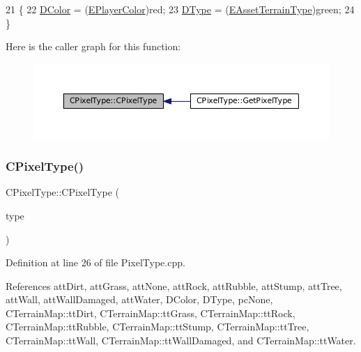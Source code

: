 \begin{DoxyCode}
21                                                   \{
22     \hyperlink{classCPixelType_a474243cf748aee94cfa207659e940b6c}{DColor} = (\hyperlink{GameDataTypes_8h_aafb0ca75933357ff28a6d7efbdd7602f}{EPlayerColor})red;
23     \hyperlink{classCPixelType_aca37f042b510a349e0d3209c73ae51c5}{DType} = (\hyperlink{classCPixelType_af06457fd1c2ff34c67ce670e633a10b0}{EAssetTerrainType})green;
24 \}
\end{DoxyCode}
Here is the caller graph for this function\+:\nopagebreak
\begin{figure}[H]
\begin{center}
\leavevmode
\includegraphics[width=350pt]{classCPixelType_a393381dca7114d6279bcee1e5f280e4b_icgraph}
\end{center}
\end{figure}
\hypertarget{classCPixelType_a8adc1d375b7d644025dcca8ff0849c76}{}\label{classCPixelType_a8adc1d375b7d644025dcca8ff0849c76} 
\subsubsection{\texorpdfstring{C\+Pixel\+Type()}{CPixelType()}\hspace{0.1cm}{\footnotesize\ttfamily [2/4]}}
{\footnotesize\ttfamily C\+Pixel\+Type\+::\+C\+Pixel\+Type (\begin{DoxyParamCaption}\item[{\hyperlink{classCTerrainMap_aff2ab991e237269941416dd79d8871d4}{C\+Terrain\+Map\+::\+E\+Tile\+Type}}]{type }\end{DoxyParamCaption})}



Definition at line 26 of file Pixel\+Type.\+cpp.



References att\+Dirt, att\+Grass, att\+None, att\+Rock, att\+Rubble, att\+Stump, att\+Tree, att\+Wall, att\+Wall\+Damaged, att\+Water, D\+Color, D\+Type, pc\+None, C\+Terrain\+Map\+::tt\+Dirt, C\+Terrain\+Map\+::tt\+Grass, C\+Terrain\+Map\+::tt\+Rock, C\+Terrain\+Map\+::tt\+Rubble, C\+Terrain\+Map\+::tt\+Stump, C\+Terrain\+Map\+::tt\+Tree, C\+Terrain\+Map\+::tt\+Wall, C\+Terrain\+Map\+::tt\+Wall\+Damaged, and C\+Terrain\+Map\+::tt\+Water.



